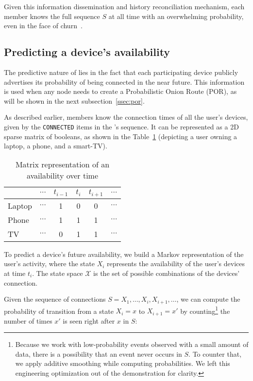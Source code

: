 Given this information dissemination and history reconciliation mechanism, each \squad member knows the full sequence $S$ at all time with an overwhelming probability, even in the face of churn~\cite{luxey:cascade}.

\subsection{Predicting a device's availability}
\label{ssec:device_availability}

The predictive nature of \name lies in the fact that each participating device publicly advertises its probability of being connected in the near future. 
This information is used when any node needs to create a Probabilistic Onion Route (POR), as will be shown in the next subsection~\ref{ssec:por}.

As described earlier, \squad members know the connection times of all the user's devices, given by the \texttt{CONNECTED} items in the \squad's sequence.
It can be represented as a 2D sparse matrix of booleans, as shown in the Table~\ref{tab:connection_times} (depicting a user owning a laptop, a phone, and a smart-TV).


\begin{table}
\caption{Matrix representation of an \squad availability over time}
\centering
\begin{tabular}{@{}lccccc@{}} \toprule
		& $\cdots$	& $t_{i-1}$	& $t_i$		& $t_{i+1}$	& $\cdots$ \\ \midrule
Laptop	& $\cdots$	& 1			& 0			& 0			& $\cdots$ \\
Phone	& $\cdots$	& 1			& 1			& 1			& $\cdots$ \\
TV		& $\cdots$	& 0			& 1			& 1			& $\cdots$ \\ \bottomrule
\end{tabular}
\label{tab:connection_times}
\end{table}

To predict a device's future availability, we build a Markov representation of the user's activity, 
where the state $X_i$ represents the availability of the user's devices at time $t_i$.
The state space $\mathcal{X}$ is the set of possible combinations of the devices' connection.

Given the \squad sequence of connections $S = X_1, \dots, X_i, X_{i+1}, \dots$,
we can compute the probability of transition from a state $X_i=x$ to $X_{i+1}=x'$ by counting\footnote{%
	Because we work with low-probability events observed with a small amount of data, there is a possibility that an event never occurs in $S$. 
	To counter that, we apply additive smoothing while computing probabilities. 
	We left this engineering optimization out of the demonstration for clarity.
} the number of times $x'$ is seen right after $x$ in $S$:


